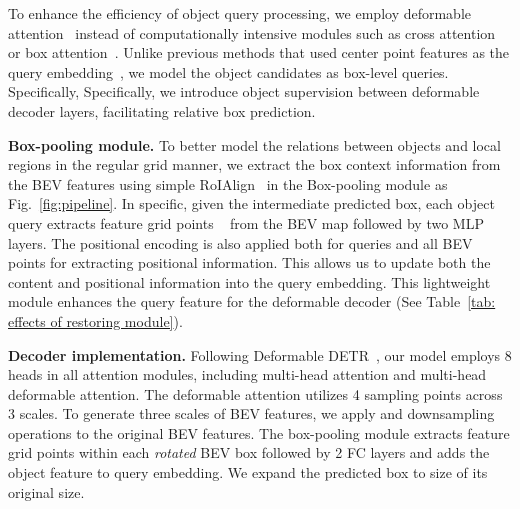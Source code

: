 \documentclass[10pt,twocolumn,letterpaper]{article}
\begin{document}
To enhance the efficiency of object query processing, we employ deformable attention~\cite{deformabledetr} instead of computationally intensive modules such as cross attention~\cite{detr} or box attention~\cite{nguyen2022boxer}. Unlike previous methods that used center point features as the query embedding~\cite{transfusion, efficientdetr}, we model the object candidates as box-level queries. Specifically, Specifically, we introduce object supervision between deformable decoder layers, facilitating relative box prediction.

\vspace{1mm}
\noindent\textbf{Box-pooling module.} To better model the relations between objects and local regions in the regular grid manner, we extract the box context information from the BEV features using simple RoIAlign~\cite{maskrcnn} in the Box-pooling module as Fig.~\ref{fig:pipeline}. In specific, given the intermediate predicted box, each object query extracts  feature grid points ~\cite{maskrcnn} from the BEV map followed by two MLP layers. The positional encoding is also applied both for queries and all BEV points for extracting positional information. This allows us to update both the content and positional information into the query embedding. 
This lightweight module enhances the query feature for the deformable decoder (See Table~\ref{tab: effects of restoring module}).

\vspace{1mm}
\noindent\textbf{Decoder implementation.}
Following Deformable DETR~\cite{deformabledetr}, our model employs 8 heads in all attention modules, including multi-head attention and multi-head deformable attention. The deformable attention utilizes 4 sampling points across 3 scales. To generate three scales of BEV features, we apply  and  downsampling operations to the original BEV features. The box-pooling module extracts  feature grid points within each \textit{rotated} BEV box followed by 2 FC layers and adds the object feature to query embedding. We expand the predicted box to  size of its original size. 
\end{document}
